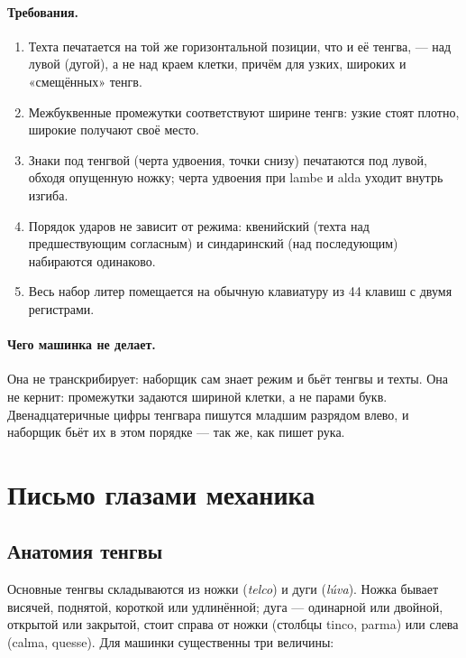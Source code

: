 \documentclass[11pt,a4paper]{article}
\begin{document}
\paragraph{Требования.}
\begin{enumerate}[label=Т\arabic*.]
  \item Техта печатается на той же горизонтальной позиции, что и её тенгва, — над лувой (дугой), а не над краем клетки, причём для узких, широких и «смещённых» тенгв.
  \item Межбуквенные промежутки соответствуют ширине тенгв: узкие стоят плотно, широкие получают своё место.
  \item Знаки под тенгвой (черта удвоения, точки снизу) печатаются под лувой, обходя опущенную ножку; черта удвоения при lambe и alda уходит внутрь изгиба.
  \item Порядок ударов не зависит от режима: квенийский (техта над предшествующим согласным) и синдаринский (над последующим) набираются одинаково.
  \item Весь набор литер помещается на обычную клавиатуру из 44 клавиш с двумя регистрами.
\end{enumerate}

\paragraph{Чего машинка не делает.} Она не транскрибирует: наборщик сам знает режим и бьёт тенгвы и техты. Она не кернит: промежутки задаются шириной клетки, а не парами букв. Двенадцатеричные цифры тенгвара пишутся младшим разрядом влево, и наборщик бьёт их в этом порядке — так же, как пишет рука.

\section{Письмо глазами механика}

\subsection{Анатомия тенгвы}

Основные тенгвы складываются из ножки (\emph{telco}) и дуги (\emph{lúva}). Ножка бывает висячей, поднятой, короткой или удлинённой; дуга — одинарной или двойной, открытой или закрытой, стоит справа от ножки (столбцы tinco, parma) или слева (calma, quesse). Для машинки существенны три величины:
\end{document}
